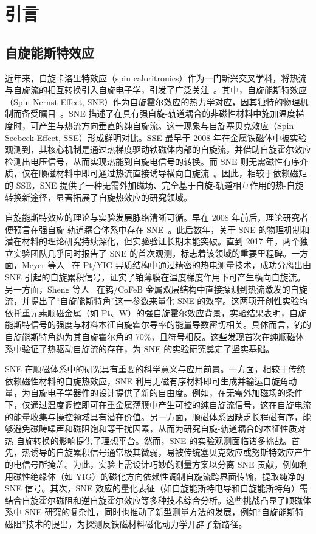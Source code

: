 \chapter{引言}
\section{自旋能斯特效应}

近年来，自旋卡洛里特效应（spin caloritronics）作为一门新兴交叉学科，将热流与自旋流的相互转换引入自旋电子学，引发了广泛关注~\cite{uchida2008Observation}。其中，自旋能斯特效应（Spin Nernst Effect, SNE）作为自旋霍尔效应的热力学对应，因其独特的物理机制而备受瞩目~\cite{cheng2016Spina, meyer2017Observationb}。SNE 描述了在具有强自旋-轨道耦合的非磁性材料中施加温度梯度时，可产生与热流方向垂直的纯自旋流。这一现象与自旋塞贝克效应（Spin Seebeck Effect, SSE）形成鲜明对比。SSE 最早于 2008 年在金属铁磁体中被实验观测到\cite{uchida2008Observationa}，其核心机制是通过热梯度驱动铁磁体内部的自旋流，并借助自旋霍尔效应检测出电压信号，从而实现热能到自旋电信号的转换。而 SNE 则无需磁性有序介质，仅在顺磁材料中即可通过热流直接诱导横向自旋流~\cite{meyer2017Observationb}。因此，相较于依赖磁矩的 SSE，SNE 提供了一种无需外加磁场、完全基于自旋-轨道相互作用的热-自旋转换新途径，显著拓展了自旋热效应的研究领域。

自旋能斯特效应的理论与实验发展脉络清晰可循。早在 2008 年前后，理论研究者便预言在强自旋-轨道耦合体系中存在 SNE~\cite{sheng2017Spin}。此后数年，关于 SNE 的物理机制和潜在材料的理论研究持续深化，但实验验证长期未能突破。直到 2017 年，两个独立实验团队几乎同时报告了 SNE 的首次观测，标志着该领域的重要里程碑。一方面，Meyer 等人~\cite{meyer2017Observationb} 在 Pt/YIG 异质结构中通过精密的热电测量技术，成功分离出由 SNE 引起的自旋累积信号，证实了铂薄膜在温度梯度作用下可产生横向自旋流。另一方面，Sheng 等人~\cite{sheng2017Spin} 在钨/CoFeB 金属双层结构中直接探测到热流激发的自旋流，并提出了“自旋能斯特角”这一参数来量化 SNE 的效率。这两项开创性实验均依托重元素顺磁金属（如 Pt、W）的强自旋霍尔效应背景，实验结果表明，自旋能斯特信号的强度与材料本征自旋霍尔导率的能量导数密切相关。具体而言，钨的自旋能斯特角约为其自旋霍尔角的 70\%，且符号相反。这些发现首次在纯顺磁体系中验证了热驱动自旋流的存在，为 SNE 的实验研究奠定了坚实基础。

SNE 在顺磁体系中的研究具有重要的科学意义与应用前景。一方面，相较于传统依赖磁性材料的自旋热效应，SNE 利用无磁有序材料即可生成并输运自旋角动量，为自旋电子学器件的设计提供了新的自由度。例如，在无需外加磁场的条件下，仅通过温度调控即可在重金属薄膜中产生可控的纯自旋流信号，这在自旋电流的能量收集与操控领域具有潜在价值。另一方面，顺磁体系因缺乏长程磁有序，能够避免磁畴噪声和磁阻饱和等干扰因素，从而为研究自旋-轨道耦合的本征性质对热-自旋转换的影响提供了理想平台。然而，SNE 的实验观测面临诸多挑战。首先，热诱导的自旋累积信号通常极其微弱，易被传统塞贝克效应或努斯特效应产生的电信号所掩盖。为此，实验上需设计巧妙的测量方案以分离 SNE 贡献，例如利用磁性绝缘体（如 YIG）的磁化方向依赖性调制自旋流跨界面传输，提取纯净的 SNE 信号。其次，SNE 效应的量化表征（如自旋能斯特电导和自旋能斯特角）需结合自旋霍尔磁阻和逆自旋霍尔效应等多种技术综合分析。这些挑战凸显了顺磁体系中 SNE 研究的复杂性，同时也推动了新型测量方法的发展，例如“自旋能斯特磁阻”技术的提出，为探测反铁磁材料磁化动力学开辟了新路径。

